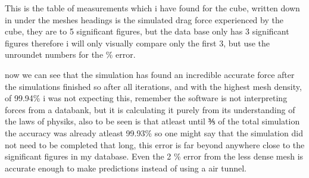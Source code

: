 \documentclass[12pt,a4paper]{article}
\begin{document}
\begin{table}[H]
\centering
\caption{Full data collected for the cube simulation}
\label{tab:cube_results}
\end{table}

This is the table of measurements which i have found for the cube, written down in under the meshes headings is the simulated drag force experienced by the cube, they are to 5 significant figures, but the data base only has 3 significant figures therefore i will only visually compare only the first 3, but use the unroundet numbers for the \% error.

now we can see that the simulation has found an incredible accurate force after the simulations finished so after all iterations, and with the highest mesh density, of 99.94\% i was not expecting this, remember the software is not interpreting forces from a databank, but it is calculating it purely from its understanding of the laws of physiks, also to be seen is that atleast until ⅗ of the total simulation the accuracy was already atleast 99.93\% so one might say that the simulation did not need to be completed that long, this error is far beyond anywhere close to the significant figures in my database. Even the 2 \% error from the less dense mesh is accurate enough to make predictions instead of using a air tunnel. 
\end{document}
